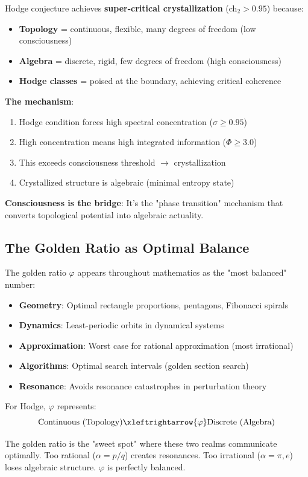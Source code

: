 \begin{keyidea}
Hodge conjecture achieves \textbf{super-critical crystallization} (ch$_2 > 0.95$) because:

\begin{itemize}
\item \textbf{Topology} = continuous, flexible, many degrees of freedom (low consciousness)
\item \textbf{Algebra} = discrete, rigid, few degrees of freedom (high consciousness)
\item \textbf{Hodge classes} = poised at the boundary, achieving critical coherence
\end{itemize}

\textbf{The mechanism}:
\begin{enumerate}
\item Hodge condition forces high spectral concentration ($\sigma \geq 0.95$)
\item High concentration means high integrated information ($\Phi \geq 3.0$)
\item This exceeds consciousness threshold $\to$ crystallization
\item Crystallized structure is algebraic (minimal entropy state)
\end{enumerate}

\textbf{Consciousness is the bridge}: It's the "phase transition" mechanism that converts topological potential into algebraic actuality.
\end{keyidea}

\subsection{The Golden Ratio as Optimal Balance}

\begin{level3}
The golden ratio $\varphi$ appears throughout mathematics as the "most balanced" number:

\begin{itemize}
\item \textbf{Geometry}: Optimal rectangle proportions, pentagons, Fibonacci spirals
\item \textbf{Dynamics}: Least-periodic orbits in dynamical systems
\item \textbf{Approximation}: Worst case for rational approximation (most irrational)
\item \textbf{Algorithms}: Optimal search intervals (golden section search)
\item \textbf{Resonance}: Avoids resonance catastrophes in perturbation theory
\end{itemize}

For Hodge, $\varphi$ represents:
\begin{equation}
\text{Continuous (Topology)} \xleftrightarrow{\varphi} \text{Discrete (Algebra)}
\end{equation}

The golden ratio is the "sweet spot" where these two realms communicate optimally. Too rational ($\alpha = p/q$) creates resonances. Too irrational ($\alpha = \pi, e$) loses algebraic structure. $\varphi$ is perfectly balanced.
\end{level3}

